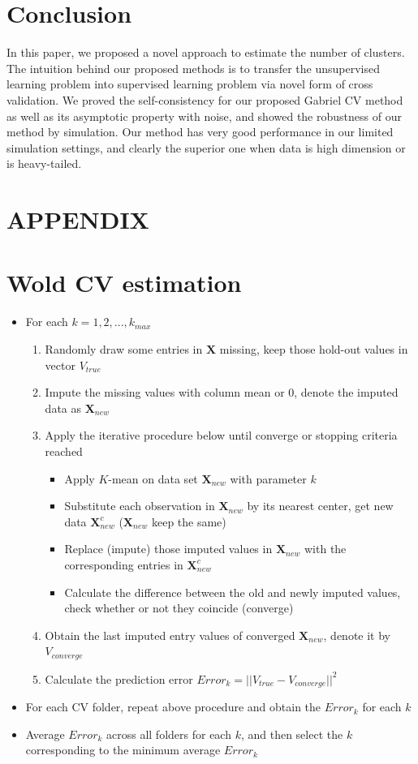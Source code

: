 \documentclass[11pt]{article}
\begin{document}
\section{Conclusion}
In this paper, we proposed a novel approach to estimate the number of clusters. The intuition behind our proposed methods is to transfer the unsupervised learning problem into supervised learning problem via novel form of cross validation. We proved the self-consistency for our proposed Gabriel CV method as well as its asymptotic property with noise, and showed the robustness of our method by simulation. Our method has very good performance in our limited simulation settings, and clearly the superior one when data is high dimension or is heavy-tailed.


\section*{\textbf{APPENDIX}}
\appendix
\section{Wold CV estimation} \label{app:foobar}
\begin{itemize}
	\item For each $k = 1,2,...,k_{max}$
	\begin{enumerate}
		\item Randomly draw some entries in $\mathbf{X}$ missing, keep those hold-out values in vector $V_{true}$
		\item Impute the missing values with column mean or $0$, denote the imputed data as $\mathbf{X}_{new}$
		\item Apply the iterative procedure below until converge or stopping criteria reached
		\begin{itemize}
			\item Apply $K$-mean on data set $\mathbf{X}_{new}$ with parameter $k$
			\item Substitute each observation in $\mathbf{X}_{new}$ by its nearest center, get new data $\mathbf{X}^c_{new}$ ($\mathbf{X}_{new}$ keep the same)
			\item Replace (impute) those imputed values in $\mathbf{X}_{new}$ with the corresponding entries in $\mathbf{X}^c_{new}$
			\item Calculate the difference between the old and newly imputed values, check whether or not they coincide (converge) 
		\end{itemize}
		\item Obtain the last imputed entry values of converged $\mathbf{X}_{new}$, denote it by $V_{converge}$
		\item Calculate the prediction error  $Error_k = ||V_{true} - V_{converge}||^2$ 
	\end{enumerate}
	\item For each CV folder, repeat above procedure and obtain the $Error_k$ for each $k$
	\item Average $Error_k$ across all folders for each $k$, and then select the $k$ corresponding to the minimum average $Error_k$ 
\end{itemize}
\end{document}
